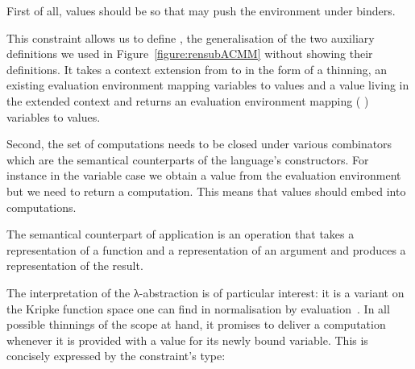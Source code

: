 First of all, values  should be  so that \semfun{} may push
the environment under binders.


This constraint allows us to define , the generalisation of the two
auxiliary definitions we used in Figure~\ref{figure:rensubACMM} without showing
their definitions. It takes a context extension from  to  in the
form of a thinning, an existing evaluation environment mapping  variables
to  values and a value living in the extended context  and returns
an evaluation environment mapping ({  }) variables to 
values.



Second, the set of computations needs to be closed under various
combinators which are the semantical counterparts of the language's
constructors.
For instance in the variable case we obtain a value from the evaluation
environment but we need to return a computation. This means that values
should embed into computations.


The semantical counterpart of application is an operation that takes a
representation of a function and a representation of an argument and
produces a representation of the result.


The interpretation of the λ-abstraction is of particular interest:
it is a variant on the Kripke function space one can find in normalisation
by evaluation~\cite{berger1991inverse,berger1993program,CoqDybSK,coquand2002formalised}.
In all possible thinnings of the scope at hand, it promises
to deliver a computation whenever it is provided with a value for its newly
bound variable. This is concisely expressed by the constraint's type:

